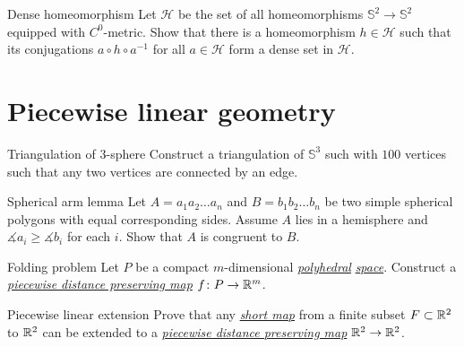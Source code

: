 \documentclass[twoside]{book}
\begin{document}
{\begin{pr}{\easy}{Dense homeomorphism}\label{Dense homeomorphism}
Let $\mathcal{H}$ be the set of all homeomorphisms $\mathbb {S}^2\to\mathbb {S}^2$ equipped with $C^0$-metric.
Show that there is a homeomorphism $h\in \mathcal{H}$ such that its conjugations $a\circ h\circ a^{-1}$ for all $a\in\mathcal{H}$ form a dense set in $\mathcal{H}$.
 
\end{pr}












\chapter{Piecewise linear geometry}




\begin{pr}{}{Triangulation of 3-sphere}\label{4-poly}
Construct a triangulation of $\mathbb{S}^3$ 
such with $100$ vertices
such that any two vertices are connected by an edge.
\end{pr}

\begin{pr}{}{Spherical arm lemma}\label{Spherical arm lemma}
Let $A=a_1a_2\dots a_n$ and $B=b_1b_2\dots b_n$ be two simple spherical polygons 
with equal corresponding sides.
Assume $A$ lies in a hemisphere and $\measuredangle a_i\ge\measuredangle b_i$ for each $i$.
Show that $A$ is congruent to $B$.
\end{pr}



\begin{pr}{}{Folding problem} \label{Folding problem}
Let $P$ be a compact $m$-dimensional 
\hyperref[Polyhedral space]{\emph{polyhedral}}
\hyperref[Polyhedral space]{\emph{space}}. 
Construct a 
\hyperref[Piecewise distance preserving map]{\emph{piecewise distance preserving map}} 
$f\colon P\to \mathbb{R}^m$.
\end{pr}

\begin{pr}{}{Piecewise linear extension} \label{iso-kirzhbraun}
Prove that any \hyperref[Short map]{\emph{short map}} from a finite subset $F\subset \mathbb{R}^2$
to 
$\mathbb{R}^2$ can be extended to a 
\hyperref[Piecewise distance preserving map]{\emph{piecewise distance preserving map}} 
$\mathbb{R}^2\to\mathbb{R}^2$.
\end{pr}


}
\end{document}

